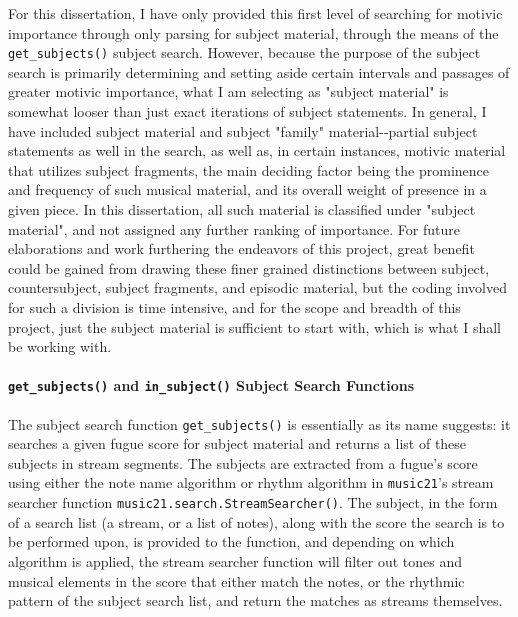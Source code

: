 For this dissertation, I have only provided this first level of
searching for motivic importance through only parsing for subject
material, through the means of the \texttt{get\_subjects()} subject
search. However, because the purpose of the subject search is primarily
determining and setting aside certain intervals and passages of greater
motivic importance, what I am selecting as "subject material" is
somewhat looser than just exact iterations of subject statements. In
general, I have included subject material and subject "family"
material-\/-partial subject statements as well in the search, as well
as, in certain instances, motivic material that utilizes subject
fragments, the main deciding factor being the prominence and frequency
of such musical material, and its overall weight of presence in a given
piece. In this dissertation, all such material is classified under
"subject material", and not assigned any further ranking of importance.
For future elaborations and work furthering the endeavors of this
project, great benefit could be gained from drawing these finer grained
distinctions between subject, countersubject, subject fragments, and
episodic material, but the coding involved for such a division is time
intensive, and for the scope and breadth of this project, just the
subject material is sufficient to start with, which is what I shall be
working with.

\paragraph{\texorpdfstring{\texttt{get\_subjects()} and
\texttt{in\_subject()} Subject Search
Functions}{get\_subjects() and in\_subject() Subject Search Functions}}\label{get_subjects-and-in_subject-subject-search-functions}

The subject search function \texttt{get\_subjects()} is essentially as
its name suggests: it searches a given fugue score for subject material
and returns a list of these subjects in stream segments. The subjects
are extracted from a fugue's score using either the note name algorithm
or rhythm algorithm in \texttt{music21}'s stream searcher function
\texttt{music21.search.StreamSearcher()}. The subject, in the form of a
search list (a stream, or a list of notes), along with the score the
search is to be performed upon, is provided to the function, and
depending on which algorithm is applied, the stream searcher function
will filter out tones and musical elements in the score that either
match the notes, or the rhythmic pattern of the subject search list, and
return the matches as streams themselves.

